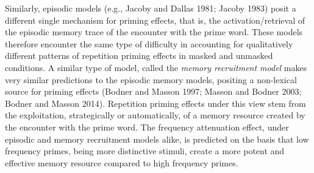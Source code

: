 \documentclass[
]{interact}
\begin{document}
Similarly, episodic models (e.g., Jacoby and Dallas 1981; Jacoby 1983)
posit a different single mechanism for priming effects, that is, the
activation/retrieval of the episodic memory trace of the encounter with
the prime word. These models therefore encounter the same type of
difficulty in accounting for qualitatively different patterns of
repetition priming effects in masked and unmasked conditions. A similar
type of model, called the \emph{memory recruitment model} makes very
similar predictions to the episodic memory models, positing a
non-lexical source for priming effects (Bodner and Masson 1997; Masson
and Bodner 2003; Bodner and Masson 2014). Repetition priming effects
under this view stem from the exploitation, strategically or
automatically, of a memory resource created by the encounter with the
prime word. The frequency attenuation effect, under episodic and memory
recruitment models alike, is predicted on the basis that low frequency
primes, being more distinctive stimuli, create a more potent and
effective memory resource compared to high frequency primes.
\end{document}
